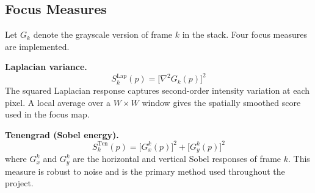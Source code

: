 \documentclass[conference]{IEEEtran}
\begin{document}
\begin{table}[!ht]
\centering
\caption{Pipeline hyperparameters used throughout all experiments.}
\label{tab:hyperparams}
\end{table}

\subsection{Focus Measures}

Let $G_k$ denote the grayscale version of frame $k$ in the stack. Four focus measures are implemented.

\textbf{Laplacian variance.}
\begin{equation}
  S_k^{\text{Lap}}(p) = \bigl[\nabla^2 G_k(p)\bigr]^2
\end{equation}
The squared Laplacian response captures second-order intensity variation at each pixel. A local average over a $W\!\times\!W$ window gives the spatially smoothed score used in the focus map.

\textbf{Tenengrad (Sobel energy).}
\begin{equation}
  S_k^{\text{Ten}}(p) = \bigl[G_x^k(p)\bigr]^2 + \bigl[G_y^k(p)\bigr]^2
\end{equation}
where $G_x^k$ and $G_y^k$ are the horizontal and vertical Sobel responses of frame $k$. This measure is robust to noise and is the primary method used throughout the project.
\end{document}
